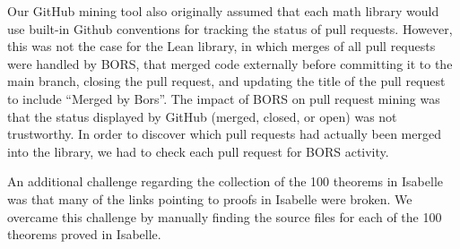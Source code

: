 \documentclass[sigconf,nonacm]{acmart}
\begin{document}
Our GitHub mining tool also originally assumed that each math library would use built-in Github conventions for tracking the status of pull requests. However, this was not the case for the Lean library, in which merges of all pull requests were handled by BORS, that merged code externally before committing it to the main branch, closing the pull request, and updating the title of the pull request to include “Merged by Bors”. The impact of BORS on pull request mining was that the status displayed by GitHub (merged, closed, or open) was not trustworthy. In order to discover which pull requests had actually been merged into the library, we had to check each pull request for BORS activity.

An additional challenge regarding the collection of the 100 theorems in Isabelle was that many of the links pointing to proofs in Isabelle were broken. We overcame this challenge by manually finding the source files for each of the 100 theorems proved in Isabelle.



\end{document}

